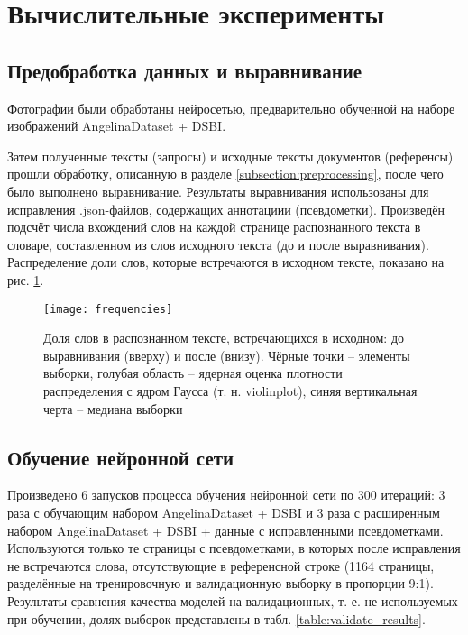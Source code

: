 \documentclass{main.tex}[subfiles]
\begin{document}
\newpage
\section{Вычислительные эксперименты}
\subsection{Предобработка данных и выравнивание}

Фотографии были обработаны нейросетью, предварительно обученной на наборе изображений AngelinaDataset + DSBI.

Затем полученные тексты (запросы) и исходные тексты документов (референсы) прошли обработку, описанную в разделе \ref{subsection:preprocessing}, после чего было выполнено выравнивание.
Результаты выравнивания использованы для исправления .json-файлов, содержащих аннотациии (псевдометки).
Произведён подсчёт числа вхождений слов на каждой странице распознанного текста в словаре, составленном из слов исходного текста (до и после выравнивания).
Распределение доли слов, которые встречаются в исходном тексте, показано на рис. \ref{fig:frequencies}.

\begin{figure}[H]
    \centering
    \texttt{[image: frequencies]}
    \caption{Доля слов в распознанном тексте, встречающихся в исходном: до выравнивания (вверху) и после (внизу). Чёрные точки -- элементы выборки, голубая область -- ядерная оценка плотности распределения с ядром Гаусса (т. н. violinplot), синяя вертикальная черта -- медиана выборки}
    \label{fig:frequencies}
\end{figure}

\subsection{Обучение нейронной сети}

Произведено 6 запусков процесса обучения нейронной сети по 300 итераций: 3 раза с обучающим набором AngelinaDataset + DSBI и 3 раза с расширенным набором AngelinaDataset + DSBI + данные с исправленными псевдометками.
Используются только те страницы с псевдометками, в которых после исправления не встречаются слова, отсутствующие в референсной строке (1164 страницы, разделённые на тренировочную и валидационную выборку в пропорции 9:1).
Результаты сравнения качества моделей на валидационных, т. е. не используемых при обучении, долях выборок представлены в табл. \ref{table:validate_results}.
\end{document}

